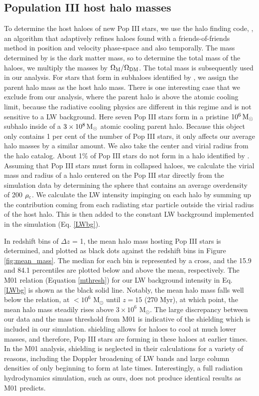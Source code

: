 \documentclass[fleqn,usenatbib]{mnras}
\begin{document}
\subsection{Population III host halo masses}
 To determine the host haloes of new Pop III stars, we use the halo finding code, \rockstar{} \citep{rockstar}, an algorithm that adaptively refines haloes found with a friends-of-friends method in position and velocity phase-space and also temporally. The mass determined by \rockstar{} is the dark matter mass, so to determine the total mass of the haloes, we multiply the masses by $\Omega_{\rm M}/\Omega_{\rm DM}$. The total mass is subsequently used in our analysis. For stars that form in subhaloes identified by \rockstar{}, we assign the parent halo mass as the host halo mass.  There is one interesting case that we exclude from our analysis, where the parent halo is above the atomic cooling limit, because the radiative cooling physics are different in this regime and is not sensitive to a LW background.  Here seven Pop III stars form in a pristine $10^6 {\rm\,M_\odot}$ subhalo inside of a $3 \times 10^8 {\rm\,M_\odot}$ atomic cooling parent halo.  Because this object only contains 1 per cent of the number of Pop III stars, it only affects our average halo masses by a similar amount. We also take the center and virial radius from the \rockstar{} halo catalog. About 1\% of Pop III stars do not form in a halo identified by \rockstar{}. Assuming that Pop III stars must form in collapsed haloes, we calculate the virial mass and radius of a halo centered on the Pop III star directly from the simulation data by determining the sphere that contains an average overdensity of 200 $\rho_{\rm c}$. We calculate the LW intensity impinging on each halo by summing up the contribution coming from each radiating star particle outside the virial radius of the host halo. This is then added to the constant LW background implemented in the simulation (Eq. \ref{LWbg}).

In redshift bins of $\Delta z$ = 1, the mean halo mass hosting Pop III stars is determined, and plotted as black dots against the redshift bins in Figure \ref{fig:mean_mass}. The median for each bin is represented by a cross, and the 15.9 and 84.1 percentiles are plotted below and above the mean, respectively. The M01 relation (Equation \ref{mthresh}) for our LW background intensity in Eq. \ref{LWbg} is shown as the black solid line. Notably, the mean halo mass falls well below the relation, at $<10^{6}$ M$_{\odot}$ until $z = 15$ (270 Myr), at which point, the mean halo mass steadily rises above $3 \times 10^{6}$ M$_{\odot}$. The large discrepancy between our data and the mass threshold from M01 is indicative of the \hh{} shielding which is included in our simulation. \hh{} shielding allows for haloes to cool at much lower masses, and therefore, Pop III stars are forming in these haloes at earlier times. In the M01 analysis, \hh{} shielding is neglected in their calculations for a variety of reasons, including the Doppler broadening of LW bands and large column densities of \hh{} only beginning to form at late times. Interestingly, a full radiation hydrodynamics simulation, such as ours, does not produce identical results as M01 predicts. 
\end{document}
